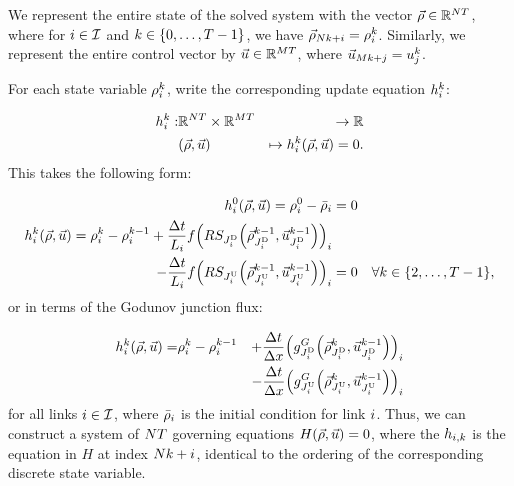 We represent the entire state of the solved system with the vector
$\vec{\rho}\in\mathbb{R}^{NT}$, where for $i\in\mathcal{I}$
and $k\in\intrange 0{\ntime-1}$, we have $\vec{\rho}_{N k+i}=\rho_{i}^{k}$.
Similarly, we represent the entire control vector by $\vec{u}\in\mathbb{R}^{MT}$,
where $\vec{u}_{Mk+j}=u_{j}^{k}$.

For each state variable $\rho_{i}^{k}$, write the corresponding
update equation $h_{i}^{k}$:

\begin{eqnarray*}
	\syseq_{\link}^{\tind}: & \mathbb{R}^{\nlinks\ntime}\times\mathbb{R}^{\ncontrols\ntime} & \rightarrow\mathbb{R}\\
	& \left(\state,\control\right) & \mapsto\syseq_{\link}^{\tind}\left(\state,\control\right)=0.
\end{eqnarray*}
This takes the following form:

\begin{eqnarray}
	h_{\link}^{0}\left(\state,\control\right)=\discrete{\link}0-\initdiscrete_{\link} & =0\label{eq:init-ge}\\
	\syseq_{\link}^{\tind}\left(\state,\control\right)=\discrete{\link}{\tind}-\discrete{\link}{\tind-1}+\frac{\Delta t}{L_{\link}}f\left(\RS_{\jdown{\link}}\left(\juncstate{\jdown{\link}}{\tind-1},\junccon{\jdown{\link}}{\tind-1}\right)\right)_{\link}\nonumber \\
	-\frac{\Delta t}{L_{\link}}f\left(\RS_{\jup{\link}}\left(\juncstate{\jup{\link}}{\tind-1},\junccon{\jup{\link}}{\tind-1}\right)\right)_{\link} & =0 & \forall k\in\intrange 2{\ntime-1},\label{eq:main-ge}
\end{eqnarray}
or in terms of the Godunov junction flux:

\begin{eqnarray}
	\syseq_{\link}^{\tind}\left(\state,\control\right)= & \discrete{\link}{\tind}-\discrete{\link}{\tind-1} & +\dfrac{\Delta t}{\Delta x}\left(\god_{\jdown{\link}}\left(\juncstate{\jdown{\link}}{\tind},\junccon{\jdown{\link}}{\tind-1}\right)\right)_{\link}\nonumber \\
	&  & -\dfrac{\Delta t}{\Delta x}\left(\god_{\jup{\link}}\left(\juncstate{\jup{\link}}{\tind},\junccon{\jup{\link}}{\tind-1}\right)\right)_{\link}\label{eq:syseq-god}
\end{eqnarray}
for all links $i\in\mathcal{I}$, where $\bar{\rho}_{i}$ is
the initial condition for link $i$. Thus, we can construct a
system of $N T$ governing equations $H\left(\state,\control\right)=0$,
where the $h_{i,k}$ is the equation in $H$ at index $N k+i$,
identical to the ordering of the corresponding discrete state variable.

